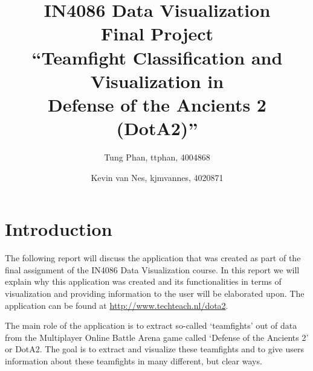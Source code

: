 \documentclass[11pt,twoside,a4paper]{article}
\title{
  IN4086 Data Visualization\\
  Final Project\\
  ``Teamfight Classification and Visualization in\\ Defense of the Ancients 2 (DotA2)''
}
\author{
    Tung Phan, ttphan, 4004868 \and
    Kevin van Nes, kjmvannes, 4020871
}
\begin{document}
\maketitle
\newpage
\section*{Introduction}
The following report will discuss the application that was created as part of the final assignment of the IN4086 Data Visualization course. In this report we will explain why this application was created and its functionalities in terms of visualization and providing information to the user will be elaborated upon. The application can be found at \url{http://www.techteach.nl/dota2}.

The main role of the application is to extract so-called `teamfights' out of data from the Multiplayer Online Battle Arena game called `Defense of the Ancients 2' or DotA2. The goal is to extract and visualize these teamfights and to give users information about these teamfights in many different, but clear ways.
\end{document}
